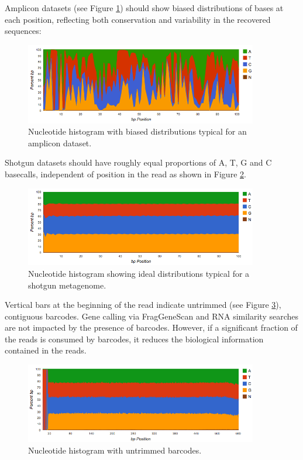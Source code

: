\documentclass[12pt,fullpage]{report}
\begin{document}
Amplicon datasets (see Figure \ref{fig:nucleotide-hist-amplicon}) should show biased distributions of bases at each position, reflecting both conservation and variability in the recovered sequences:

\begin{figure}[ht]
\begin{center}
\includegraphics[width=4in]{Images/nucleotide-hist-amplicon.png}
\end{center}
\caption{
 Nucleotide histogram with biased distributions typical for an amplicon dataset.}
\label{fig:nucleotide-hist-amplicon}
\end{figure}

Shotgun datasets should have roughly equal proportions of A, T, G and C basecalls, independent of position in the read as shown in Figure \ref{fig:nucleotide-hist-ok}.

\begin{figure}[ht]
\begin{center}
\includegraphics[width=4in]{Images/nucleotide-hist-ok.png}
\end{center}
\caption{
Nucleotide histogram showing ideal distributions typical for a shotgun metagenome.
}
\label{fig:nucleotide-hist-ok}
\end{figure}

Vertical bars at the beginning of the read indicate untrimmed (see Figure \ref{fig:nucleotide-hist-barcodes}), contiguous barcodes. Gene calling via FragGeneScan \cite{FGS} and \gls{RNA} similarity searches are not impacted by the presence of barcodes. However, if a significant fraction of the reads is consumed by barcodes, it reduces the biological information contained in the reads.

\begin{figure}[ht]
\begin{center}
\includegraphics[width=4in]{Images/nucleotide-hist-barcodes.png}
\end{center}
\caption{
Nucleotide histogram with untrimmed barcodes.
}
\label{fig:nucleotide-hist-barcodes}
\end{figure}
\end{document}
